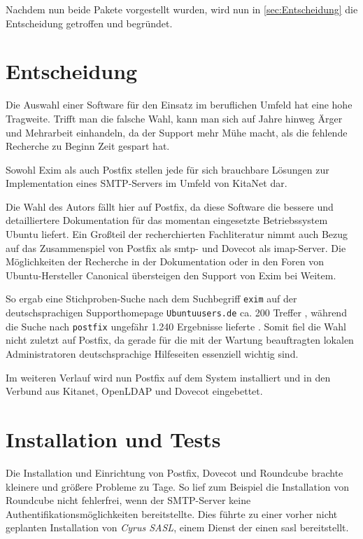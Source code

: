 Nachdem nun beide Pakete vorgestellt wurden, wird nun in \autoref{sec:Entscheidung} die Entscheidung getroffen und begründet.

\chapter{Entscheidung}
\label{sec:Entscheidung}

Die Auswahl einer Software für den Einsatz im beruflichen Umfeld hat eine hohe Tragweite. Trifft man die falsche Wahl, kann man sich auf Jahre hinweg Ärger und Mehrarbeit einhandeln, da der Support mehr Mühe macht, als die fehlende Recherche zu Beginn Zeit gespart hat.

Sowohl Exim als auch Postfix stellen jede für sich brauchbare Lösungen zur Implementation eines SMTP-Servers im Umfeld von KitaNet dar. 

Die Wahl des Autors fällt hier auf Postfix, da diese Software die bessere und detailliertere Dokumentation für das momentan eingesetzte Betriebssystem Ubuntu liefert. Ein Großteil der recherchierten Fachliteratur nimmt auch Bezug auf das Zusammenspiel von Postfix als \ac{smtp}- und Dovecot als \ac{imap}-Server.
Die Möglichkeiten der Recherche in der Dokumentation oder in den Foren von Ubuntu-Hersteller Canonical übersteigen den Support von Exim bei Weitem.

So ergab eine Stichproben-Suche nach dem Suchbegriff \verb+exim+ auf der deutschsprachigen Supporthomepage \verb+Ubuntuusers.de+ ca. 200 Treffer \citep[vgl.][]{googleexim}, während die Suche nach \verb+postfix+ ungefähr 1.240 Ergebnisse lieferte \citep[vgl.][]{googlepostfix}.
Somit fiel die Wahl nicht zuletzt auf Postfix, da gerade für die mit der Wartung beauftragten lokalen Administratoren deutschsprachige Hilfeseiten essenziell wichtig sind.

Im weiteren Verlauf wird nun Postfix auf dem System installiert und in den Verbund aus Kitanet, OpenLDAP und Dovecot eingebettet.

\chapter{Installation und Tests}

Die Installation und Einrichtung von Postfix, Dovecot und Roundcube brachte kleinere und größere Probleme zu Tage. 
So lief zum Beispiel die Installation von Roundcube nicht fehlerfrei, wenn der SMTP-Server keine Authentifikationsmöglichkeiten \citep[vgl. hierzu][]{rfc4954} bereitstellte. 
Dies führte zu einer vorher nicht geplanten Installation von \textit{Cyrus SASL}, einem Dienst der einen \ac{sasl} bereitstellt. 

